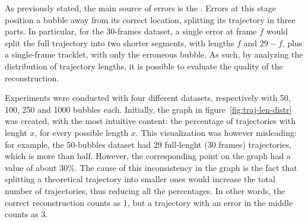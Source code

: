 As previously stated, the main source of errors is the \match*.
Errors at this stage position a bubble away from its correct location, splitting its trajectory in three parts.
In particular, for the 30-frames dataset, a single error at frame $f$ would split the full trajectory into two shorter segments, with lengths $f$ and $29-f$, plus a single-frame tracklet, with only the erroneous bubble.
As such, by analyzing the distribution of trajectory lengths, it is possible to evaluate the quality of the reconstruction.


Experiments were conducted with four different datasets, respectively with 50, 100, 250 and 1000 bubbles each.
Initially, the graph in figure~\ref{fig:traj-len-distr} was created, with the most intuitive content: the percentage of trajectories with lenght $x$, for every possible length $x$.
This visualization was however misleading: for example, the 50-bubbles dataset had 29 full-lenght (30 frames) trajectories, which is more than half.
However, the corresponding point on the graph had a value of about 30\%.
The cause of this inconsistency in the graph is the fact that splitting a theoretical trajectory into smaller ones would increase the total number of trajectories, thus reducing all the percentages.
In other words, the correct reconstruction counts as 1, but a trajectory with an error in the middle counts as 3.
